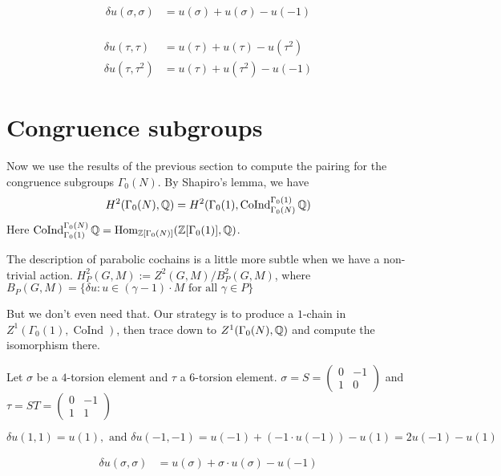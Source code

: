 \documentclass[12pt]{article}
\theoremstyle{definition}
\def\Z{{\Bbb Z}}
\def\Q{{\Bbb Q}}
\def\Hom{\text{Hom}}
\def\CoInd{\operatorname{CoInd}}
\begin{document}
\begin{align*}
\delta u(\sigma,\sigma) &=u(\sigma)+ u(\sigma)-u(-1)\\
\end{align*}

\begin{align*}
\delta u (\tau,\tau) & = u(\tau) + u(\tau) - u(\tau^2)\\
\delta u(\tau,\tau^2) & = u(\tau)+u(\tau^2)- u(-1)
\end{align*}


\section{Congruence subgroups}

Now we use the results of the previous section to compute the pairing for the congruence subgroups $\Gamma_0(N)$. By Shapiro's lemma, we have
	$$H^2(\Gamma_0(N),\Q)=H^2(\Gamma_0(1),\CoInd^{\Gamma_0(1)}_{\Gamma_0(N)}\Q)$$
Here $\CoInd^{\Gamma_0(N)}_{\Gamma_0(1)}\Q=\Hom_{\Z[\Gamma_0(N)]}(\Z[\Gamma_0(1)],\Q)$.

The description of parabolic cochains is a little more subtle when we have a non-trivial action. $H^2_P(G,M):= Z^2(G,M)/B^2_P(G,M)$, where $B_P(G, M)=\{ \delta u : u\in (\gamma-1)\cdot M \text{ for all } \gamma\in P\}$

But we don't even need that. Our strategy is to produce a $1$-chain in $Z^1(\Gamma_0(1),\CoInd)$, then trace down to $Z^1(\Gamma_0(N),\Q)$ and compute the isomorphism there. 

Let $\sigma$ be a $4$-torsion element and $\tau$ a $6$-torsion element. $\sigma=S=\begin{pmatrix} 0 & -1\\ 1 & 0\end{pmatrix}$ and $\tau=ST=\begin{pmatrix} 0 & -1 \\ 1 & 1\end{pmatrix}$


\begin{equation*}
	\delta u(1,1)=u(1), \text{ and } \delta u(-1,-1) =u(-1)+(-1\cdot u(-1))-u(1)=2u(-1)-u(1)
\end{equation*}

\begin{align*}
\delta u(\sigma,\sigma) &=u(\sigma)+\sigma\cdot u(\sigma)-u(-1)\\
\end{align*}
\end{document}
